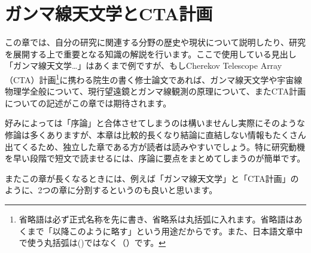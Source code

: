 \chapter{ガンマ線天文学とCTA計画}
\label{chap_review}

この章では、自分の研究に関連する分野の歴史や現状について説明したり、研究を展開する上で重要となる知識の解説を行います。ここで使用している見出し「ガンマ線天文学…」はあくまで例ですが、もしCherekov Telescope Array（CTA）計画\footnote{省略語は必ず正式名称を先に書き、省略系は丸括弧に入れます。省略語はあくまで「以降このように略す」という用途だからです。また、日本語文章中で使う丸括弧は()ではなく（）です。}に携わる院生の書く修士論文であれば、ガンマ線天文学や宇宙線物理学全般について、現行望遠鏡とガンマ線観測の原理について、またCTA計画についての記述がこの章では期待されます。

好みによっては「序論」と合体させてしまうのは構いませんし実際にそのような修論は多くありますが、本章は比較的長くなり結論に直結しない情報もたくさん出てくるため、独立した章である方が読者は読みやすいでしょう。特に研究動機を早い段階で短文で読ませるには、序論に要点をまとめてしまうのが簡単です。

またこの章が長くなるときには、例えば「ガンマ線天文学」と「CTA計画」のように、2つの章に分割するというのも良いと思います。
